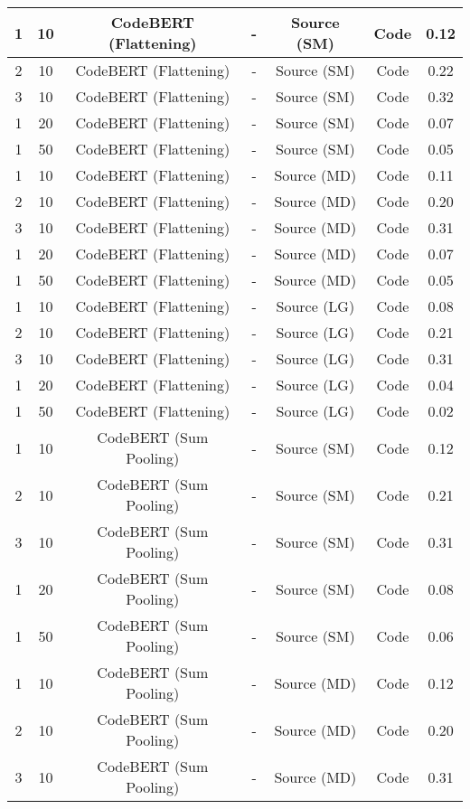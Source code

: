 \begin{longtable}{|c|c|c|c|c|c|c|}
\hline
1 & 10 & CodeBERT (Flattening) & - & Source (SM) & Code & 0.12 \\
\hline
2 & 10 & CodeBERT (Flattening) & - & Source (SM) & Code & 0.22 \\
\hline
3 & 10 & CodeBERT (Flattening) & - & Source (SM) & Code & 0.32 \\
\hline
1 & 20 & CodeBERT (Flattening) & - & Source (SM) & Code & 0.07 \\
\hline
1 & 50 & CodeBERT (Flattening) & - & Source (SM) & Code & 0.05 \\
\hline
1 & 10 & CodeBERT (Flattening) & - & Source (MD) & Code & 0.11 \\
\hline
2 & 10 & CodeBERT (Flattening) & - & Source (MD) & Code & 0.20 \\
\hline
3 & 10 & CodeBERT (Flattening) & - & Source (MD) & Code & 0.31 \\
\hline
1 & 20 & CodeBERT (Flattening) & - & Source (MD) & Code & 0.07 \\
\hline
1 & 50 & CodeBERT (Flattening) & - & Source (MD) & Code & 0.05 \\
\hline
1 & 10 & CodeBERT (Flattening) & - & Source (LG) & Code & 0.08 \\
\hline
2 & 10 & CodeBERT (Flattening) & - & Source (LG) & Code & 0.21 \\
\hline
3 & 10 & CodeBERT (Flattening) & - & Source (LG) & Code & 0.31 \\
\hline
1 & 20 & CodeBERT (Flattening) & - & Source (LG) & Code & 0.04 \\
\hline
1 & 50 & CodeBERT (Flattening) & - & Source (LG) & Code & 0.02 \\
\hline
1 & 10 & CodeBERT (Sum Pooling) & - & Source (SM) & Code & 0.12 \\
\hline
2 & 10 & CodeBERT (Sum Pooling) & - & Source (SM) & Code & 0.21 \\
\hline
3 & 10 & CodeBERT (Sum Pooling) & - & Source (SM) & Code & 0.31 \\
\hline
1 & 20 & CodeBERT (Sum Pooling) & - & Source (SM) & Code & 0.08 \\
\hline
1 & 50 & CodeBERT (Sum Pooling) & - & Source (SM) & Code & 0.06 \\
\hline
1 & 10 & CodeBERT (Sum Pooling) & - & Source (MD) & Code & 0.12 \\
\hline
2 & 10 & CodeBERT (Sum Pooling) & - & Source (MD) & Code & 0.20 \\
\hline
3 & 10 & CodeBERT (Sum Pooling) & - & Source (MD) & Code & 0.31 \\

\end{longtable}
